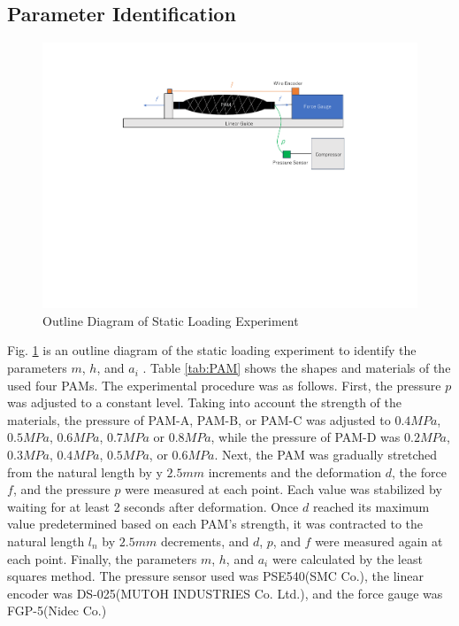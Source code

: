 \subsection{Parameter Identification}

\begin{figure}[h]
    \centering
    \includegraphics[width=\columnwidth]{fig/static_experiment.pdf}
    \caption{Outline Diagram of Static Loading Experiment}
    \label{fig:static_equipment}
 \end{figure}

Fig. \ref{fig:static_equipment} is an outline diagram of the static loading experiment to identify the parameters $m$, $h$, and $a_i$ .
Table \ref{tab:PAM} shows the shapes and materials of the used four PAMs.
The experimental procedure was as follows.
First, the pressure $p$ was adjusted to a constant level.
Taking into account the strength of the materials, the pressure of PAM-A, PAM-B, or PAM-C was adjusted to $0.4\si{MPa}$, $0.5\si{MPa}$, $0.6\si{MPa}$, $0.7\si{MPa}$ or $0.8\si{MPa}$, while the pressure of PAM-D was $0.2\si{MPa}$, $0.3\si{MPa}$, $0.4\si{MPa}$, $0.5\si{MPa}$, or $0.6\si{MPa}$.
Next, the PAM was gradually stretched from the natural length by y $2.5\si{mm}$ increments and the deformation $d$, the force $f$, and the pressure $p$ were measured at each point.
Each value was stabilized by waiting for at least 2 seconds after deformation.
Once $d$ reached its maximum value predetermined based on each PAM's strength, it was contracted to the natural length $l_n$ by  $2.5\si{mm}$ decrements, and $d$, $p$, and $f$ were measured again at each point.
Finally, the parameters $m$, $h$, and $a_i$ were calculated by the least squares method.
The pressure sensor used was PSE540(SMC Co.), the linear encoder was DS-025(MUTOH INDUSTRIES Co. Ltd.), and the force gauge was FGP-5(Nidec Co.)

